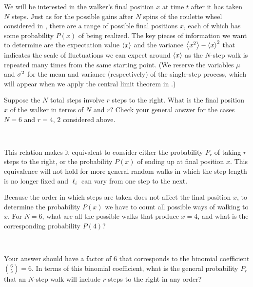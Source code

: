 We will be interested in the walker's final position $x$ at time $t$ after it has taken $N$ steps.
Just as for the possible gains after $N$ spins of the roulette wheel considered in , there are a range of possible final positions $x$, each of which has some probability $P(x)$ of being realized.
The key pieces of information we want to determine are the expectation value $\left\langle x \right\rangle$ and the variance $\left\langle x^2 \right\rangle - \left\langle x \right\rangle^2$ that indicates the scale of fluctuations we can expect around $\left\langle x \right\rangle$ as the $N$-step walk is repeated many times from the same starting point.
(We reserve the variables $\mu$ and $\sigma^2$ for the mean and variance (respectively) of the single-step process, which will appear when we apply the central limit theorem in .)

Suppose the $N$ total steps involve $r$ steps to the right.
What is the final position $x$ of the walker in terms of $N$ and $r$?
Check your general answer for the cases $N = 6$ and $r = 4$, $2$ considered above.
\begin{mdframed}
  \ \\[80 pt]
\end{mdframed}
This relation makes it equivalent to consider either the probability $P_r$ of taking $r$ steps to the right, or the probability $P(x)$ of ending up at final position $x$.
This equivalence will not hold for more general random walks in which the step length is no longer fixed and $\ell_i$ can vary from one step to the next.

Because the order in which steps are taken does not affect the final position $x$, to determine the probability $P(x)$ we have to count all possible ways of walking to $x$.
For $N = 6$, what are all the possible walks that produce $x = 4$, and what is the corresponding probability $P(4)$?
\begin{mdframed}
  \ \\[100 pt]
\end{mdframed}
Your answer should have a factor of $6$ that corresponds to the binomial coefficient $\binom{6}{5} = 6$.
In terms of this binomial coefficient, what is the general probability $P_r$ that an $N$-step walk will include $r$ steps to the right in any order?
\begin{mdframed}
  \ \\[80 pt]
\end{mdframed}

